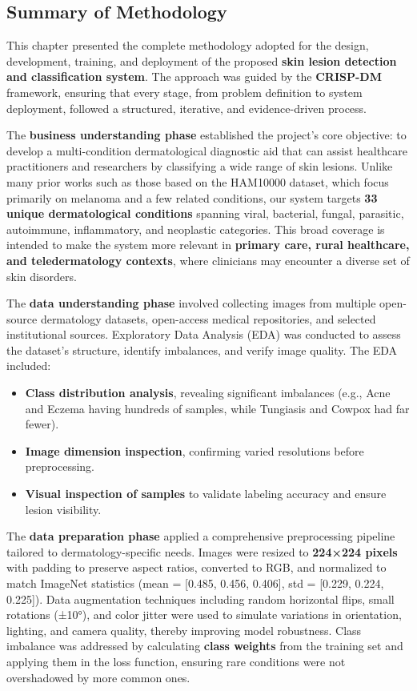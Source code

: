 \documentclass[
  12pt,
  oneside]{article}
\providecommand{\tightlist}{%
  \setlength{\itemsep}{0pt}\setlength{\parskip}{0pt}}
\begin{document}
\subsection{Summary of Methodology}\label{summary-of-methodology}

This chapter presented the complete methodology adopted for the design,
development, training, and deployment of the proposed \textbf{skin
lesion detection and classification system}. The approach was guided by
the \textbf{CRISP-DM} framework, ensuring that every stage, from problem
definition to system deployment, followed a structured, iterative, and
evidence-driven process.

The \textbf{business understanding phase} established the project's core
objective: to develop a multi-condition dermatological diagnostic aid
that can assist healthcare practitioners and researchers by classifying
a wide range of skin lesions. Unlike many prior works such as those
based on the HAM10000 dataset, which focus primarily on melanoma and a
few related conditions, our system targets \textbf{33 unique
dermatological conditions} spanning viral, bacterial, fungal, parasitic,
autoimmune, inflammatory, and neoplastic categories. This broad coverage
is intended to make the system more relevant in \textbf{primary care,
rural healthcare, and teledermatology contexts}, where clinicians may
encounter a diverse set of skin disorders.

The \textbf{data understanding phase} involved collecting images from
multiple open-source dermatology datasets, open-access medical
repositories, and selected institutional sources. Exploratory Data
Analysis (EDA) was conducted to assess the dataset's structure, identify
imbalances, and verify image quality. The EDA included:

\begin{itemize}
\tightlist
\item
  \textbf{Class distribution analysis}, revealing significant imbalances
  (e.g., Acne and Eczema having hundreds of samples, while Tungiasis and
  Cowpox had far fewer).
\item
  \textbf{Image dimension inspection}, confirming varied resolutions
  before preprocessing.
\item
  \textbf{Visual inspection of samples} to validate labeling accuracy
  and ensure lesion visibility.
\end{itemize}

The \textbf{data preparation phase} applied a comprehensive
preprocessing pipeline tailored to dermatology-specific needs. Images
were resized to \textbf{224×224 pixels} with padding to preserve aspect
ratios, converted to RGB, and normalized to match ImageNet statistics
(mean = {[}0.485, 0.456, 0.406{]}, std = {[}0.229, 0.224, 0.225{]}).
Data augmentation techniques including random horizontal flips, small
rotations (±10°), and color jitter were used to simulate variations in
orientation, lighting, and camera quality, thereby improving model
robustness. Class imbalance was addressed by calculating \textbf{class
weights} from the training set and applying them in the loss function,
ensuring rare conditions were not overshadowed by more common ones.
\end{document}
